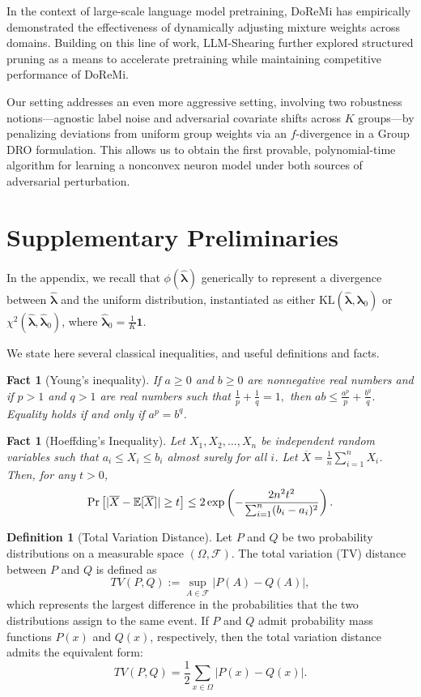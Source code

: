 \documentclass[11pt]{article}
\newcounter{thm}
\numberwithin{thm}{section}
\theoremstyle{plain}
\newtheorem{fact}[thm]{Fact}
\theoremstyle{definition}
\newtheorem{definition}[thm]{Definition}
\theoremstyle{remark} \newtheorem{remark}[thm]{Remark}
\def\vlambda{{\bm{\lambda}}}
\def\cF{{\mathcal{F}}}
\newcommand{\E}{\mathbb{E}}
\DeclarePairedDelimiter\abs{|}{|}
\newcommand{\evlambda}{\widehat{\vlambda}}
\def\mathbf{\bm}
\begin{document}
In the context of large-scale language model pretraining, DoReMi \citep{xie2023doremi} has empirically demonstrated the effectiveness of dynamically adjusting mixture weights across domains. 
Building on this line of work, LLM-Shearing \citep{xia2024shearedllamaacceleratinglanguage} further explored structured pruning as a means to accelerate pretraining while maintaining competitive performance of DoReMi.

Our setting addresses an even more aggressive setting, involving two robustness notions---agnostic label noise and adversarial covariate shifts across \(K\) groups—by penalizing deviations from uniform group weights via an \(f\)-divergence in a Group DRO formulation.  This allows us to obtain the first provable, polynomial-time algorithm for learning a nonconvex neuron model under both sources of adversarial perturbation. 

\section{Supplementary Preliminaries}
\label{sec:suppl_prelims}
{In the appendix, we recall that $\phi(\evlambda)$ generically to represent a divergence between $\evlambda$ and the uniform distribution, instantiated as either $\mathrm{KL}(\evlambda, \evlambda_0)$ or $\chi^2(\evlambda, \evlambda_0)$, where $\evlambda_0 = \tfrac{1}{K}\mathbf{1}$.} 

We state here several classical inequalities, and useful definitions and facts. 
\begin{fact}[Young's inequality]\label{fact:young}
	If $a \geq 0$ and $b \geq 0$ are {nonnegative real numbers} and if $p > 1$ and $q > 1$ are real numbers such that 
	\(
	\frac{1}{p} + \frac{1}{q} = 1,
	\)
	then
	\(
	ab \leq \frac{a^p}{p} + \frac{b^q}{q}.
	\) 
	Equality holds if and only if $a^p = b^q$.
\end{fact}

\begin{fact}[Hoeffding's Inequality]
	\label{fact:hoeffding}
	Let \(X_1, X_2, \ldots, X_n\) be independent random variables such that \(a_i \le X_i \le b_i\) almost surely for all \(i\). Let \(\overline{X} = \frac{1}{n} \sum_{i=1}^{n} X_i\). Then, for any \(t > 0\),
\[
	\Pr\left[\abs{\overline{X} - \E[\overline{X}]} \ge t\right] \le 2 \exp\left(-\frac{2n^2 t^2}{\sum_{i=1}^{n} (b_i - a_i)^2}\right).
	\]
\end{fact}

\begin{definition}[Total Variation Distance]
\label{def:tv}
Let \(P\) and \(Q\) be two probability distributions on a measurable space \((\Omega, \cF)\). The total variation (TV) distance between \(P\) and \(Q\) is defined as
\[
TV(P, Q) := \sup_{A \in \cF} |P(A) - Q(A)|,
\]
which represents the largest difference in the probabilities that the two distributions assign to the same event. If \(P\) and \(Q\) admit probability mass functions \(P(x)\) and \(Q(x)\), respectively, then the total variation distance admits the equivalent form:
\[
TV(P, Q) = \frac{1}{2} \sum_{x \in \Omega} |P(x) - Q(x)|.
\]
\end{definition}
\end{document}
